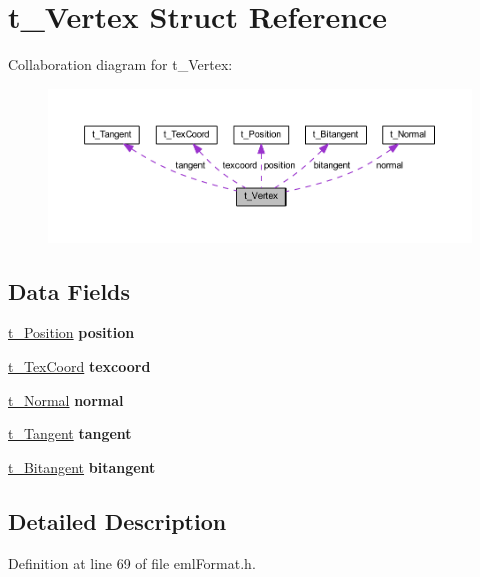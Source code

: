 \hypertarget{structt___vertex}{}\section{t\+\_\+\+Vertex Struct Reference}
\label{structt___vertex}


Collaboration diagram for t\+\_\+\+Vertex\+:
\nopagebreak
\begin{figure}[H]
\begin{center}
\leavevmode
\includegraphics[width=350pt]{structt___vertex__coll__graph}
\end{center}
\end{figure}
\subsection*{Data Fields}
\begin{DoxyCompactItemize}
\item 
\hyperlink{structt___position}{t\+\_\+\+Position} {\bfseries position}\hypertarget{structt___vertex_ae4355225c9b256c57befc5443a6abc75}{}\label{structt___vertex_ae4355225c9b256c57befc5443a6abc75}

\item 
\hyperlink{structt___tex_coord}{t\+\_\+\+Tex\+Coord} {\bfseries texcoord}\hypertarget{structt___vertex_ac3e650952c4bdeb5f50792431e8fc331}{}\label{structt___vertex_ac3e650952c4bdeb5f50792431e8fc331}

\item 
\hyperlink{structt___normal}{t\+\_\+\+Normal} {\bfseries normal}\hypertarget{structt___vertex_a3446a7022e0097b523831519945c919e}{}\label{structt___vertex_a3446a7022e0097b523831519945c919e}

\item 
\hyperlink{structt___tangent}{t\+\_\+\+Tangent} {\bfseries tangent}\hypertarget{structt___vertex_a6f2e7323622be244ef48f24183703859}{}\label{structt___vertex_a6f2e7323622be244ef48f24183703859}

\item 
\hyperlink{structt___bitangent}{t\+\_\+\+Bitangent} {\bfseries bitangent}\hypertarget{structt___vertex_a4ea6a54c85522dfda9455b8d67593881}{}\label{structt___vertex_a4ea6a54c85522dfda9455b8d67593881}

\end{DoxyCompactItemize}


\subsection{Detailed Description}


Definition at line 69 of file eml\+Format.\+h.

